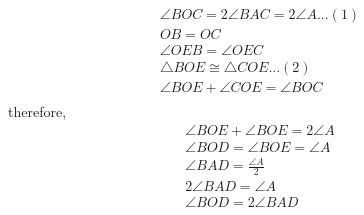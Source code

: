 \begin{frame}
\begin{align*}
\angle{BOC}= 2\angle{BAC}=2\angle{A} ...(1)\\
OB=OC\\
\angle{OEB}=\angle{OEC}\\
\triangle{BOE} \cong \triangle{COE}  ...(2)\\
\angle{BOE}+\angle{COE}=\angle{BOC}\\
\end{align*}
therefore,
\begin{align*}
\angle{BOE}+\angle{BOE}=2\angle{A}\\
\angle{BOD}=\angle{BOE}=\angle{A}\\
\angle{BAD}=\frac{\angle{A}}{2}\\
2\angle{BAD}=\angle{A}\\
\angle{BOD}=2\angle{BAD}\\
\end{align*}
\end{frame}
